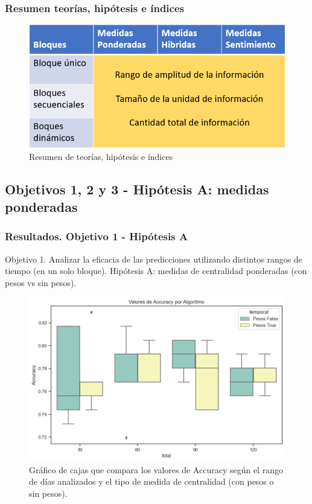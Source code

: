 \documentclass{beamer}
\begin{document}
\begin{frame}
	\frametitle{Resumen teorías, hipótesis e índices}
	
	\begin{figure}[H]
		\centering
		\includegraphics[width=0.9\linewidth]{figs/imagen23}
		\caption{Resumen de teorías, hipótesis e índices}
		\label{fig:imagen23}
	\end{figure}
\end{frame}

\subsection{Objetivos 1, 2 y 3 - Hipótesis A: medidas ponderadas}
\begin{frame}
	\frametitle{Resultados. Objetivo 1 - Hipótesis A}
	\begin{block}{Objetivo 1. Analizar la eficacia de las predicciones utilizando distintos rangos de tiempo (en un solo bloque).}
		Hipótesis A: medidas de centralidad ponderadas (con pesos vs sin pesos).
	\end{block}
	
\begin{figure}[H]
	\centering
	\includegraphics[width=0.7\linewidth]{figs/cap6/figura_12}
	\caption{Gráfico de cajas que compara los valores de Accuracy según el rango de días analizados y el tipo de medida de centralidad (con pesos o sin pesos).}
	\label{fig:figura12}
\end{figure}
	
\end{frame}
\end{document}
